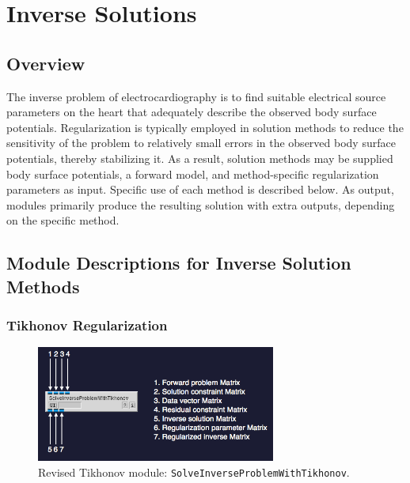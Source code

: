 \documentclass[fleqn,11pt,openany]{book}
\begin{document}
%

\chapter{Inverse Solutions}
\label{ch:inv}

\section{Overview}

The inverse problem of electrocardiography is to find suitable electrical source parameters on the heart that adequately describe the observed body surface potentials. Regularization is typically employed in solution methods to reduce the sensitivity of the problem to relatively small errors in the observed body surface potentials, thereby stabilizing it. As a result, solution methods may be supplied body surface potentials, a forward model, and method-specific regularization parameters as input. Specific use of each method is described below. As output, modules primarily produce the resulting solution with extra outputs, depending on the specific method.

\section{Module Descriptions for Inverse Solution Methods}

\subsection{Tikhonov Regularization}

\begin{figure}[H]
\begin{center}
\includegraphics[width=0.7\textwidth]{ECGToolkitGuide_figures/tik1.png}
\caption{Revised Tikhonov module: {\tt SolveInverseProblemWithTikhonov}.  }
\label{tik_module}
\end{center}
\end{figure}
\end{document}
